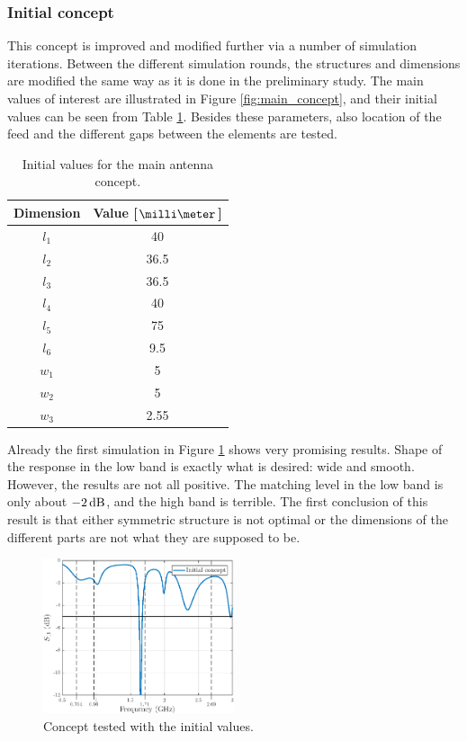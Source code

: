 \subsubsection{Initial concept}
\label{sec:initial_concept}
This concept is improved and modified further via a number of simulation iterations. Between the different simulation rounds, the structures and dimensions are modified the same way as it is done in the preliminary study. The main values of interest are illustrated in Figure \ref{fig:main_concept}, and their initial values can be seen from Table \ref{tab:initial_concept}. Besides these parameters, also location of the feed and the different gaps between the elements are tested. 
\begin{table}[H]
    \centering
    \caption{Initial values for the main antenna concept.}
    \label{tab:initial_concept}
    \begin{tabular}{|c|c|}
        \hline
        \textbf{Dimension} & \textbf{Value [$\milli\meter$]} \\
        \hline
        $l_1$ & 40\\
        \hline
        $l_2$ & 36.5\\
        \hline
        $l_3$ & 36.5\\
        \hline
        $l_4$ & 40\\
        \hline
        $l_5$ & 75\\
        \hline
        $l_6$ & 9.5\\
        \hline
        $w_1$ & 5\\
        \hline
        $w_2$ & 5\\
        \hline
        $w_3$ & 2.55\\
        \hline
    \end{tabular}
\end{table}

Already the first simulation in Figure \ref{fig:concept_ini} shows very promising results. Shape of the response in the low band is exactly what is desired: wide and smooth. However, the results are not all positive. The matching level in the low band is only about $-2\,\mathrm{dB}$, and the high band is terrible. The first conclusion of this result is that either symmetric structure is not optimal or the dimensions of the different parts are not what they are supposed to be.
\begin{figure}[H]
    \centering
    \includegraphics[width=0.5\textwidth]{img/concept_ini.eps}
    \caption{Concept tested with the initial values.}
    \label{fig:concept_ini}
\end{figure}


